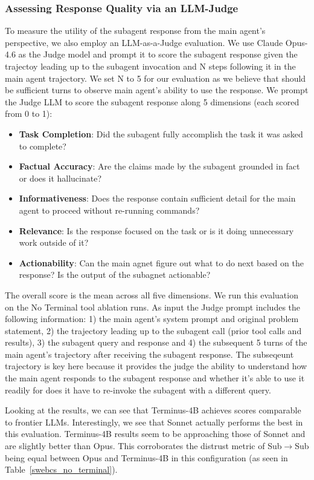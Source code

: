 \documentclass[sigconf,review]{acmart}
\begin{document}
\subsubsection{Assessing Response Quality via an LLM-Judge}
To measure the utility of the subagent response from the main agent's perspective, we also employ an LLM-as-a-Judge evaluation. We use Claude Opus-4.6 as the Judge model and prompt it to score the subagent response given the trajectoy leading up to the subagent invocation and N steps following it in the main agent trajectory. We set N to 5 for our evaluation as we believe that should be sufficient turns to observe main agent's ability to use the response. We prompt the Judge LLM to score the subagent response along 5 dimensions (each scored from 0 to 1):
\begin{itemize}
    \item \textbf{Task Completion}: Did the subagent fully accomplish the task it was asked to complete?
    \item \textbf{Factual Accuracy}: Are the claims made by the subagent grounded in fact or does it hallucinate?
    \item \textbf{Informativeness}: Does the response contain sufficient detail for the main agent to proceed without re-running commands?
    \item \textbf{Relevance}: Is the response focused on the task or is it doing unnecessary work outside of it?
    \item \textbf{Actionability}: Can the main agnet figure out what to do next based on the response? Is the output of the subagnet actionable?
\end{itemize}

The overall score is the mean across all five dimensions. We run this evaluation on the No Terminal tool ablation runs. As input the Judge prompt includes the following information: 1) the main agent's system prompt and original problem statement, 2) the trajectory leading up to the subagent call (prior tool calls and results), 3) the subagent query and response and 4) the subsequent 5 turns of the main agent's trajectory after receiving the subagent response. The subseqeunt trajectory is key here because it provides the judge the ability to understand how the main agent responds to the subagent response and whether it's able to use it readily for does it have to re-invoke the subagent with a different query.

Looking at the results, we can see that Terminus-4B achieves scores comparable to frontier LLMs. Interestingly, we see that Sonnet actually performs the best in this evaluation. Terminus-4B results seem to be approaching those of Sonnet and are slightly better than Opus. This corroborates the distrust metric of Sub$\to$Sub being equal between Opus and Terminus-4B in this configuration (as seen in Table~\ref{swebcs_no_terminal}). 
\end{document}
